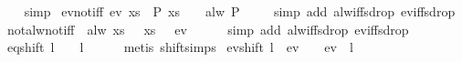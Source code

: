 \begin{isabellebody}
%
\isadelimproof
\ \ %
\endisadelimproof
%
\isatagproof
{}\isamarkupfalse%
\ simp%
\endisatagproof
{\isafoldproof}%
%
\isadelimproof
\isanewline
%
\endisadelimproof
\isanewline
{}\isamarkupfalse%
\ ev{\isacharunderscore}not{\isacharunderscore}iff{\isacharcolon}\ {\isachardoublequoteopen}ev\ {\isacharparenleft}{\isasymlambda}xs{\isachardot}\ {\isasymnot}\ P\ xs{\isacharparenright}\ {\isasymomega}\ {\isacharequal}\ {\isacharparenleft}{\isasymnot}\ alw\ P\ {\isasymomega}{\isacharparenright}{\isachardoublequoteclose}\isanewline
%
\isadelimproof
\ \ %
\endisadelimproof
%
\isatagproof
{}\isamarkupfalse%
\ {\isacharparenleft}simp\ add{\isacharcolon}\ alw{\isacharunderscore}iff{\isacharunderscore}sdrop\ ev{\isacharunderscore}iff{\isacharunderscore}sdrop{\isacharparenright}%
\endisatagproof
{\isafoldproof}%
%
\isadelimproof
\isanewline
%
\endisadelimproof
\isanewline
{}\isamarkupfalse%
\ not{\isacharunderscore}alw{\isacharunderscore}not{\isacharunderscore}iff{\isacharcolon}\ {\isachardoublequoteopen}{\isacharparenleft}{\isasymnot}\ alw\ {\isacharparenleft}{\isasymlambda}xs{\isachardot}\ {\isasymnot}\ {\isasympsi}\ xs{\isacharparenright}\ {\isasymomega}{\isacharparenright}\ {\isacharequal}\ ev\ {\isasympsi}\ {\isasymomega}{\isachardoublequoteclose}\isanewline
%
\isadelimproof
\ \ %
\endisadelimproof
%
\isatagproof
{}\isamarkupfalse%
\ {\isacharparenleft}simp\ add{\isacharcolon}\ alw{\isacharunderscore}iff{\isacharunderscore}sdrop\ ev{\isacharunderscore}iff{\isacharunderscore}sdrop{\isacharparenright}%
\endisatagproof
{\isafoldproof}%
%
\isadelimproof
\isanewline
%
\endisadelimproof
\isanewline
{}\isamarkupfalse%
\ eq{\isacharunderscore}shift{\isacharcolon}\ {\isachardoublequoteopen}{\isasymexists}l\ {\isasymomega}{\isacharprime}{\isachardot}\ {\isasymomega}\ {\isacharequal}\ l\ {\isacharat}{\isacharminus}\ {\isasymomega}{\isacharprime}{\isachardoublequoteclose}\isanewline
%
\isadelimproof
\ \ %
\endisadelimproof
%
\isatagproof
{}\isamarkupfalse%
\ {\isacharparenleft}metis\ shift{\isachardot}simps{\isacharparenleft}{}{\isacharparenright}{\isacharparenright}%
\endisatagproof
{\isafoldproof}%
%
\isadelimproof
\isanewline
%
\endisadelimproof
\isanewline
{}\isamarkupfalse%
\ ev{\isacharunderscore}shift{\isacharcolon}\ {\isachardoublequoteopen}{\isasymexists}l\ {\isasymomega}{\isacharprime}{\isachardot}\ ev\ {\isasympsi}\ {\isasymomega}\ {\isacharequal}\ ev\ {\isasympsi}\ {\isacharparenleft}l\ {\isacharat}{\isacharminus}\ {\isasymomega}{\isacharprime}{\isacharparenright}{\isachardoublequoteclose}\isanewline

\end{isabellebody}
